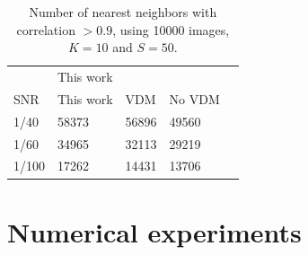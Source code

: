 \documentclass{article}
\begin{document}
\begin{table}[]
\centering
\begin{tabular}{lllll}
      & \multicolumn{2}{l}{This work} & \multicolumn{2}{l}{\cite{zhao}} \\ \cline{2-5} 
SNR   & This work        & \cite{zhao} VDM        & \cite{zhao} No VDM                  \\ \cline{2-5} 
1/40 &  58373         & 56896          & 49560       \\
1/60  & 34965          & 32113          & 29219       \\
1/100 & 17262      & 14431           & 13706        \\ \cline{2-5} 
\end{tabular}
\caption{Number of nearest neighbors with correlation $>0.9$, 
using 10000 images, $K=10$ and $S=50$.
\label{table:tab}}
\end{table}




\section{Numerical experiments}
\label{sec:num}
\end{document}
